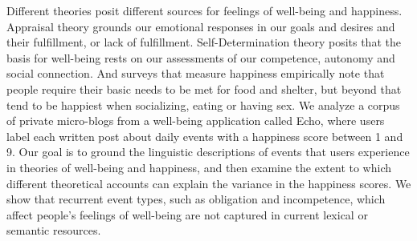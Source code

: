Different theories posit different sources for feelings of well-being and happiness.  Appraisal theory grounds our emotional responses in our goals and desires and their fulfillment, or lack of fulfillment. Self-Determination theory posits that the basis for well-being rests on our assessments of our competence, autonomy and social connection. And surveys that measure happiness empirically note that people require their basic needs to be met for food and shelter, but beyond that tend to be happiest when socializing, eating or having sex. We analyze a corpus of private micro-blogs from a well-being application called Echo, where users label each written post about daily events with a happiness score between 1 and 9.  Our goal is to ground the linguistic descriptions of events that users experience in theories of well-being and happiness, and then examine the extent to which different theoretical accounts can explain the variance in the happiness scores.  We show that recurrent event types, such as obligation and incompetence, which affect people's feelings of well-being are not captured in current lexical or semantic resources.
